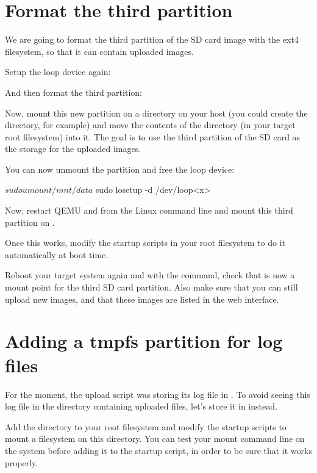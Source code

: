 \section{Format the third partition}

We are going to format the third partition of the SD card image
with the ext4 filesystem, so that it can contain uploaded images.

Setup the loop device again:

And then format the third partition:


Now, mount this new partition on a directory on your host (you could
create the  directory, for example) and move the contents of the
 directory (in your target root filesystem) into
it. The goal is to use the third partition of the SD card as the storage
for the uploaded images.

You can now unmount the partition and free the loop device:
\begin{bashinput}
$ sudo umount /mnt/data
$ sudo losetup -d /dev/loop<x>
\end{bashinput}

Now, restart QEMU and from the Linux command line and
mount this third partition on .

Once this works, modify the startup scripts in your root filesystem
to do it automatically at boot time.

Reboot your target system again and with the  command, check that
 is now a mount point for the third SD card
partition. Also make sure that you can still upload new images, and
that these images are listed in the web interface.

\section{Adding a tmpfs partition for log files}

For the moment, the upload script was storing its log file in
. To avoid seeing this log file in
the directory containing uploaded files, let's store it in
 instead.

Add the  directory to your root filesystem and modify
the startup scripts to mount a  filesystem on this
directory. You can test your  mount command line on the
system before adding it to the startup script, in order to be sure
that it works properly.

